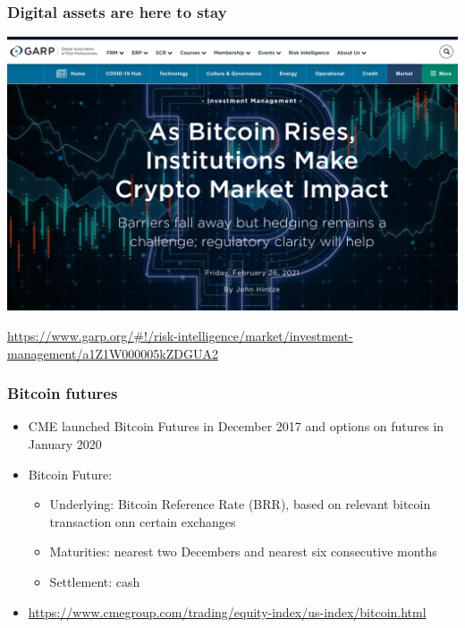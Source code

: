 \documentclass[10pt,mathserif,notes=show]{beamer}
\renewcommand{\(}{\begin{columns}}
\renewcommand{\)}{\end{columns}}
\newcommand{\<}[1]{\begin{column}{#1}}
\renewcommand{\>}{\end{column}}
\theoremstyle{definition}
\begin{document}
\begin{frame}
  \frametitle{Digital assets are here to stay}
  \begin{center}
    \includegraphics[scale=.25]{../_pics/ScreenshotGARP.pdf}
  \end{center}
  {\tiny \url{https://www.garp.org/\#!/risk-intelligence/market/investment-management/a1Z1W000005kZDGUA2}}
\end{frame}

\begin{frame}
  \frametitle{Bitcoin futures}
  \begin{itemize}
    \addtolength{\itemsep}{3pt}
  \item CME launched Bitcoin Futures in December 2017 and options on
    futures in January 2020
  \item Bitcoin Future:
    \begin{itemize}
    \item Underlying: Bitcoin Reference Rate (BRR), based on relevant
      bitcoin transaction onn certain exchanges
    \item Maturities: nearest two Decembers and nearest six consecutive
      months 
      \item Settlement: cash
    \end{itemize}
    \item {\footnotesize \url{https://www.cmegroup.com/trading/equity-index/us-index/bitcoin.html}}
  \end{itemize}
\end{frame}
\end{document}
